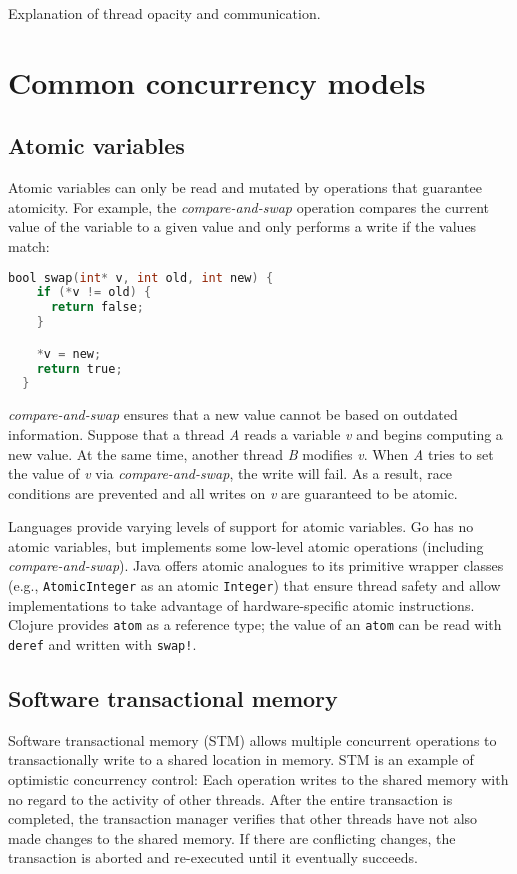 \documentclass{sig-alternate}
\newcommand{\code}[1]{\texttt{#1}}
\begin{document}
Explanation of thread opacity and communication.

\section{Common concurrency models}

\subsection{Atomic variables}

Atomic variables can only be read and mutated by operations that guarantee atomicity. For example, the \emph{compare-and-swap} operation compares the current value of the variable to a given value and only performs a write if the values match:

\begin{lstlisting}[language=C]
  bool swap(int* v, int old, int new) {
    if (*v != old) {
      return false;
    }

    *v = new;
    return true;
  }
\end{lstlisting}

\emph{compare-and-swap} ensures that a new value cannot be based on outdated information. Suppose that a thread \emph{A} reads a variable \emph{v} and begins computing a new value. At the same time, another thread \emph{B} modifies \emph{v}. When \emph{A} tries to set the value of \emph{v} via \emph{compare-and-swap}, the write will fail. As a result, race conditions are prevented and all writes on \emph{v} are guaranteed to be atomic.

Languages provide varying levels of support for atomic variables. Go has no atomic variables, but implements some low-level atomic operations (including \emph{compare-and-swap}). Java offers atomic analogues to its primitive wrapper classes (e.g., \code{AtomicInteger} as an atomic \code{Integer}) that ensure thread safety and allow implementations to take advantage of hardware-specific atomic instructions. Clojure provides \code{atom} as a reference type; the value of an \code{atom} can be read with \code{deref} and written with \code{swap!}.

\subsection{Software transactional memory}

Software transactional memory (STM) allows multiple concurrent operations to transactionally write to a shared location in memory. STM is an example of optimistic concurrency control: Each operation writes to the shared memory with no regard to the activity of other threads. After the entire transaction is completed, the transaction manager verifies that other threads have not also made changes to the shared memory. If there are conflicting changes, the transaction is aborted and re-executed until it eventually succeeds.~\cite{Shavit1995}
\end{document}
